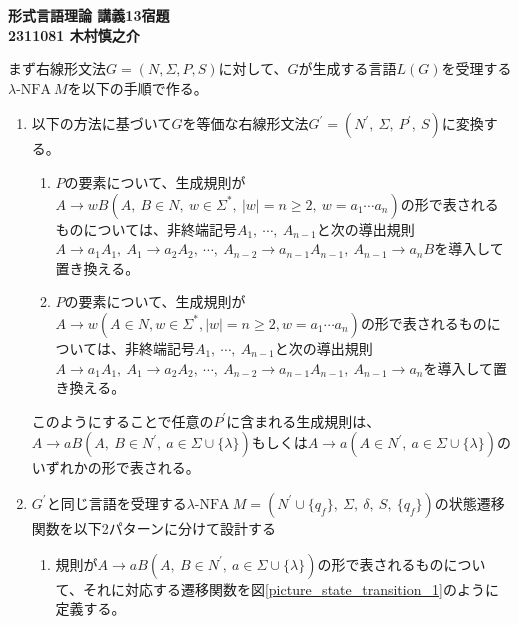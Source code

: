 \documentclass[uplatex,dvipdfmx,a4paper,10pt]{jsarticle}
\begin{document}
    \begin{center}
        {\Large{\bf 形式言語理論 講義13宿題}} \\
        {\bf 2311081 木村慎之介} \\
    \end{center}

    まず右線形文法\(G = (N,\Sigma,P,S)\)に対して、\(G\)が生成する言語\(L(G)\)を受理する\(\lambda\text{-NFA}\ M\)を以下の手順で作る。
    \begin{enumerate}
      \item 以下の方法に基づいて\(G\)を等価な右線形文法\(G^{'} = (N^{'},\ \Sigma,\ P^{'},\ S)\)に変換する。
      \begin{enumerate}
        \item \(P\)の要素について、生成規則が\(A \rightarrow wB(A,\ B \in N,\ w \in \Sigma^{*},\ |w| = n \geq 2,\ w = a_1 \cdots a_n)\)の形で表されるものについては、非終端記号\(A_1,\ \cdots ,\ A_{n-1}\)と次の導出規則\(A \rightarrow a_1A_1,\  A_1 \rightarrow a_2A_2,\ \cdots ,\ A_{n-2} \rightarrow a_{n-1}A_{n-1},\ A_{n-1} \rightarrow a_nB\)を導入して置き換える。
        \item \(P\)の要素について、生成規則が\(A \rightarrow w(A \in N, w \in \Sigma^{*}, |w| = n \geq 2, w = a_1 \cdots a_n)\)の形で表されるものについては、非終端記号\(A_1,\ \cdots ,\ A_{n-1}\)と次の導出規則\(A \rightarrow a_1A_1,\ A_1 \rightarrow a_2A_2,\ \cdots ,\ A_{n-2} \rightarrow a_{n-1}A_{n-1},\ A_{n-1} \rightarrow a_n\)を導入して置き換える。
      \end{enumerate}
      \hspace{1em}このようにすることで任意の\(P^{'}\)に含まれる生成規則は、\(A \rightarrow aB(A,\ B \in N^{'},\ a \in \Sigma \cup \{\lambda\})\)もしくは\(A \rightarrow a(A \in N^{'},\ a \in \Sigma \cup \{\lambda\})\)のいずれかの形で表される。
      \item \(G^{'}\)と同じ言語を受理する\(\lambda \text{-NFA}\ M = (N^{'} \cup \{q_f\},\ \Sigma,\ \delta,\ S,\ \{q_f\})\)の状態遷移関数を以下2パターンに分けて設計する
      \begin{enumerate}
        \item 規則が\(A \rightarrow aB(A,\ B \in N^{'},\ a \in \Sigma \cup \{\lambda\})\)の形で表されるものについて、それに対応する遷移関数を図\ref{picture_state_transition_1}のように定義する。
        
        \begin{figure}[H]
          \centering
\end{figure}
\end{enumerate}
\end{enumerate}
\end{document}
